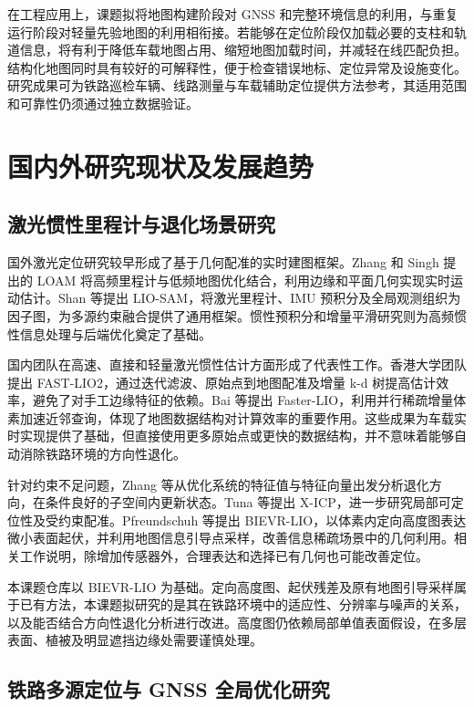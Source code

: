 \documentclass[UTF8,a4paper,12pt,fontset=fandol]{ctexart}
\begin{document}
在工程应用上，课题拟将地图构建阶段对 GNSS 和完整环境信息的利用，与重复运行阶段对轻量先验地图的利用相衔接。若能够在定位阶段仅加载必要的支柱和轨道信息，将有利于降低车载地图占用、缩短地图加载时间，并减轻在线匹配负担。结构化地图同时具有较好的可解释性，便于检查错误地标、定位异常及设施变化。研究成果可为铁路巡检车辆、线路测量与车载辅助定位提供方法参考，其适用范围和可靠性仍须通过独立数据验证。

\section{国内外研究现状及发展趋势}

\subsection{激光惯性里程计与退化场景研究}

国外激光定位研究较早形成了基于几何配准的实时建图框架。Zhang 和 Singh 提出的 LOAM 将高频里程计与低频地图优化结合，利用边缘和平面几何实现实时运动估计\cite{zhang2014loam}。Shan 等提出 LIO-SAM，将激光里程计、IMU 预积分及全局观测组织为因子图，为多源约束融合提供了通用框架\cite{shan2020liosam}。惯性预积分和增量平滑研究则为高频惯性信息处理与后端优化奠定了基础\cite{forster2017preintegration,kaess2012isam2}。

国内团队在高速、直接和轻量激光惯性估计方面形成了代表性工作。香港大学团队提出 FAST-LIO2，通过迭代滤波、原始点到地图配准及增量 k-d 树提高估计效率，避免了对手工边缘特征的依赖\cite{xu2022fastlio2}。Bai 等提出 Faster-LIO，利用并行稀疏增量体素加速近邻查询，体现了地图数据结构对计算效率的重要作用\cite{bai2022fasterlio}。这些成果为车载实时实现提供了基础，但直接使用更多原始点或更快的数据结构，并不意味着能够自动消除铁路环境的方向性退化。

针对约束不足问题，Zhang 等从优化系统的特征值与特征向量出发分析退化方向，在条件良好的子空间内更新状态\cite{zhang2016degeneracy}。Tuna 等提出 X-ICP，进一步研究局部可定位性及受约束配准\cite{tuna2024xicp}。Pfreundschuh 等提出 BIEVR-LIO，以体素内定向高度图表达微小表面起伏，并利用地图信息引导点采样，改善信息稀疏场景中的几何利用\cite{pfreundschuh2026bievr}。相关工作说明，除增加传感器外，合理表达和选择已有几何也可能改善定位。

本课题仓库以 BIEVR-LIO 为基础。定向高度图、起伏残差及原有地图引导采样属于已有方法，本课题拟研究的是其在铁路环境中的适应性、分辨率与噪声的关系，以及能否结合方向性退化分析进行改进。高度图仍依赖局部单值表面假设，在多层表面、植被及明显遮挡边缘处需要谨慎处理。

\subsection{铁路多源定位与 GNSS 全局优化研究}
\end{document}
